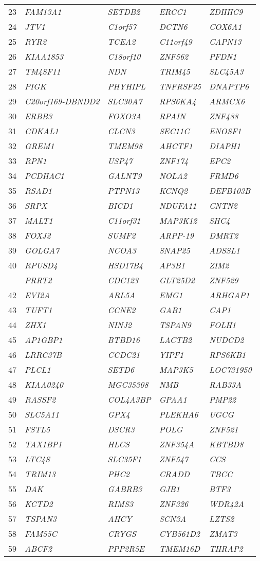 \documentclass[letterpaper,12pt]{article}
\numberwithin{equation}{appendix}
\begin{document}
\begin{longtable}[c]{r>{\itshape}l>{\itshape}l>{\itshape}l>{\itshape}l}
23&FAM13A1&SETDB2&ERCC1&ZDHHC9\tabularnewline
24&JTV1&C1orf57&DCTN6&COX6A1\tabularnewline
25&RYR2&TCEA2&C11orf49&CAPN13\tabularnewline
26&KIAA1853&C18orf10&ZNF562&PFDN1\tabularnewline
27&TM4SF11&NDN&TRIM45&SLC45A3\tabularnewline
28&PIGK&PHYHIPL&TNFRSF25&DNAPTP6\tabularnewline
29&C20orf169-DBNDD2&SLC30A7&RPS6KA4&ARMCX6\tabularnewline
30&ERBB3&FOXO3A&RPAIN&ZNF488\tabularnewline
31&CDKAL1&CLCN3&SEC11C&ENOSF1\tabularnewline
32&GREM1&TMEM98&AHCTF1&DIAPH1\tabularnewline
33&RPN1&USP47&ZNF174&EPC2\tabularnewline
34&PCDHAC1&GALNT9&NOLA2&FRMD6\tabularnewline
35&RSAD1&PTPN13&KCNQ2&DEFB103B\tabularnewline
36&SRPX&BICD1&NDUFA11&CNTN2\tabularnewline
37&MALT1&C11orf31&MAP3K12&SHC4\tabularnewline
38&FOXJ2&SUMF2&ARPP-19&DMRT2\tabularnewline
39&GOLGA7&NCOA3&SNAP25&ADSSL1\tabularnewline
40&RPUSD4&HSD17B4&AP3B1&ZIM2\tabularnewline
\newpage
41&PRRT2&CDC123&GLT25D2&ZNF529\tabularnewline
42&EVI2A&ARL5A&EMG1&ARHGAP1\tabularnewline
43&TUFT1&CCNE2&GAB1&CAP1\tabularnewline
44&ZHX1&NINJ2&TSPAN9&FOLH1\tabularnewline
45&AP1GBP1&BTBD16&LACTB2&NUDCD2\tabularnewline
46&LRRC37B&CCDC21&YIPF1&RPS6KB1\tabularnewline
47&PLCL1&SETD6&MAP3K5&LOC731950\tabularnewline
48&KIAA0240&MGC35308&NMB&RAB33A\tabularnewline
49&RASSF2&COL4A3BP&GPAA1&PMP22\tabularnewline
50&SLC5A11&GPX4&PLEKHA6&UGCG\tabularnewline
51&FSTL5&DSCR3&POLG&ZNF521\tabularnewline
52&TAX1BP1&HLCS&ZNF354A&KBTBD8\tabularnewline
53&LTC4S&SLC35F1&ZNF547&CCS\tabularnewline
54&TRIM13&PHC2&CRADD&TBCC\tabularnewline
55&DAK&GABRB3&GJB1&BTF3\tabularnewline
56&KCTD2&RIMS3&ZNF326&WDR42A\tabularnewline
57&TSPAN3&AHCY&SCN3A&LZTS2\tabularnewline
58&FAM55C&CRYGS&CYB561D2&ZMAT3\tabularnewline
59&ABCF2&PPP2R5E&TMEM16D&THRAP2\tabularnewline
\bottomrule
\end{longtable}
\end{document}
